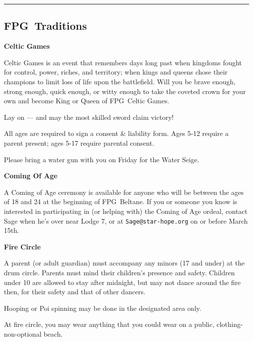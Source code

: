 \documentclass[9pt,twoside,openright,final,article]{memoir}
\def\fpg{{\beltanefamily FPG\ }}
\let\oldsection=\section
\renewcommand{\section}[1]{%
  \vspace{3pt}%
  \needspace{1in}%
  { \hrule } \nopagebreak %
  \begin{center}\oldsection{#1}\end{center}\nopagebreak{}}
\renewcommand{\subsection}[1]{%
  \vspace{6pt}%
  \needspace{1.25in}%
  \begin{center}\textbf{\Large \beltanefamily #1}\end{center}

  \nopagebreak}
\begin{document}
\begin{multicols}{2}
  \section{\fpg Traditions}

  \subsection{Celtic Games} \label{celticgames}

  Celtic Games is an event that remembers days long past when kingdoms
  fought for control, power, riches, and territory; when kings and
  queens chose their champions to limit loss of life upon the
  battlefield. Will you be brave enough, strong enough, quick enough,
  or witty enough to take the coveted crown for your own and become
  King or Queen of \fpg Celtic Games.

  Lay on --- and may the most skilled sword claim victory!

  All ages are required to sign a consent \& liability form. Ages 5-12
  require a parent present; ages 5-17 require parental consent.

  Please bring a water gun with you on Friday for the Water Seige.

  \subsection{Coming Of Age}

  A Coming of Age ceremony is available for anyone who will be between
  the ages of 18 and 24 at the beginning of \fpg Beltane. If you or
  someone you know is interested in participating in (or helping with)
  the Coming of Age ordeal, contact Sage when he's over near Lodge 7,
  or at \texttt{Sage@star-hope.org} on or before March 15th.


  \subsection{Fire Circle} \label{fire}

  A parent (or adult guardian) must accompany any minors (17 and
  under) at the drum circle. Parents must mind their children's
  presence and safety. Children under 10 are allowed to stay after
  midnight, but may not dance around the fire then, for their safety
  and that of other dancers.

  Hooping or Poi spinning may be done in the designated area only.

  At fire circle, you may wear anything that you could wear on a
  public, clothing-non-optional beach.


\end{multicols}
\end{document}
